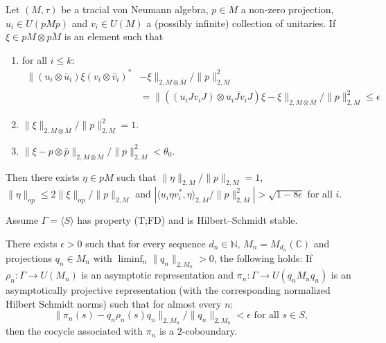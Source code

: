 \documentclass[10pt,a4paper]{amsart}
\DeclareMathOperator{\op}{op}
\newcommand{\C}{{\mathbb{C}}}
\newcommand{\N}{{\mathbb{N}}}
\begin{document}
\begin{corollary}
\label{cor:Connes_trick_vN}
    Let $(M,\tau)$ be a tracial von Neumann algebra, $p \in M$ a non-zero projection, $u_i \in U(pMp)$ and $v_i \in U(M)$ a (possibly infinite) collection of unitaries. 
    If $\xi \in pM \otimes \overline{pM}$ is an element such that 
    \begin{enumerate}
        \item  for  all $i \leq k$:
        \begin{align*}
            \| (u_i\otimes \bar u_i)\xi  (v_i \otimes \bar v_i)^* &- \xi \|_{2,M\otimes\overline M}/ \|p\|^2_{2,M} \\
            &=\| ((u_i Jv_iJ)\otimes \overline{u_iJv_iJ})\xi - \xi \|_{2,M\otimes\overline M}/ \|p\|^2_{2,M} \leq \epsilon
        \end{align*}
        \item $\| \xi \|_{2,M \otimes \overline{M}} / \|p\|^2_{2,M}= 1$.
        \item $\| \xi - p \otimes \bar p \|_{2, M \otimes \overline M}/ \|p\|^2_{2,M} < \theta_0$. 
    \end{enumerate}
   Then there exists $\eta \in pM$ such that $\| \eta \|_{2,M} / \|p \|_{2,M} = 1$, $\| \eta \|_{op} \leq 2 \| \xi\|_{\op} / \| p \|_{2,M}$ and $|\langle u_i\eta v_i^*,\eta \rangle_{2,M} / \| p \|_{2,M}^2| > \sqrt{1- 8\epsilon}$ for all $i$.
\end{corollary}

\begin{theorem}
\label{thm:NPS_analog}
Assume $\Gamma = \langle S \rangle$ has property (T;FD) and is Hilbert--Schmidt stable.

There exists $\epsilon> 0$ such that for every sequence $d_n \in \N$, $M_n = M_{d_n}(\C)$ and projections $q_n \in M_n$ with $\liminf_n \| q_n\|_{2,M_n} > 0$, the following holds: If  $\rho_n: \Gamma \to U( M_n )$ is an asymptotic representation and $\pi_n:\Gamma\rightarrow U(q_n M_n q_n)$ is an asymptotically projective representation  (with the corresponding normalized Hilbert Schmidt norms) such that for almost every $n$:
$$\| \pi_n(s) - q_n\rho_n(s) q_n\|_{2,M_n} / \|q_n \|_{2,M_n}< \epsilon \text{ for all $s \in S$,}$$
then the cocycle associated with $\pi_n$ is a $2$-coboundary.
\end{theorem}
\end{document}
